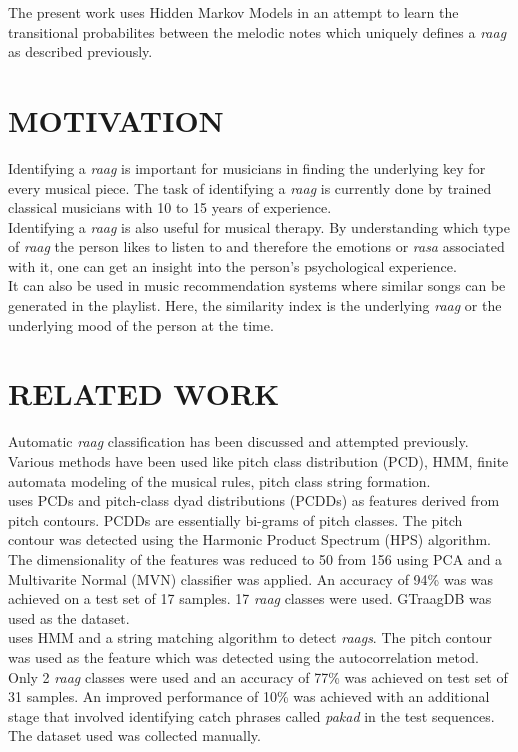 \documentclass[letterpaper, 10 pt, conference]{ieeeconf}  %
\begin{document}
The present work uses Hidden Markov Models in an attempt to learn the transitional probabilites between the melodic notes which uniquely defines a \textit{raag} as described previously. 


\section{MOTIVATION}

Identifying a \textit{raag} is important for musicians in finding the underlying key for every musical piece. The task of identifying a \textit{raag} is currently done by trained classical musicians with 10 to 15 years of experience. \\
Identifying a \textit{raag} is also useful for musical therapy. By understanding which type of \textit{raag} the person likes to listen to and therefore the emotions or \textit{rasa} associated with it, one can get an insight into the person's psychological experience. \\
It can also be used in music recommendation systems where similar songs can be generated in the playlist. Here, the similarity index is the underlying \textit{raag} or the underlying mood of the person at the time. 

\section{RELATED WORK}

Automatic \textit{raag} classification has been discussed and attempted previously. Various methods have been used like pitch class distribution (PCD), HMM, finite automata modeling of the musical rules, pitch class string formation.  \\
\cite{c3} uses PCDs and pitch-class dyad distributions (PCDDs) as features derived from pitch contours. PCDDs are essentially bi-grams of pitch classes. The pitch contour was detected  using the Harmonic Product Spectrum (HPS) algorithm. The dimensionality of the features was reduced to 50 from 156 using PCA and a Multivarite Normal (MVN) classifier was applied. An accuracy of 94\% was was achieved on a test set of 17 samples. 17 \textit{raag} classes were used. GTraagDB \cite{c2} was used as the dataset. \\
\cite{c4} uses HMM and a string matching algorithm to detect \textit{raags}. The pitch contour was used as the feature which was detected using the autocorrelation metod. Only 2 \textit{raag} classes were used and an accuracy of 77\% was achieved on test set of 31 samples. An improved performance of 10\% was achieved with an additional stage that involved identifying catch phrases called \textit{pakad} in the test sequences. The dataset used was collected manually.  
\end{document}
